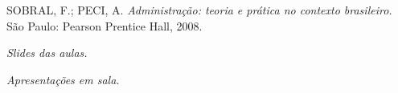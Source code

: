 \begin{thebibliography}{9}
        SOBRAL, F.; PECI, A. 
    \textit{Administração: teoria e prática no contexto brasileiro.}
        São Paulo: Pearson Prentice Hall, 2008.

        \textit{Slides das aulas.}
    
        \textit{Apresentações em sala.}
 
\end{thebibliography}
